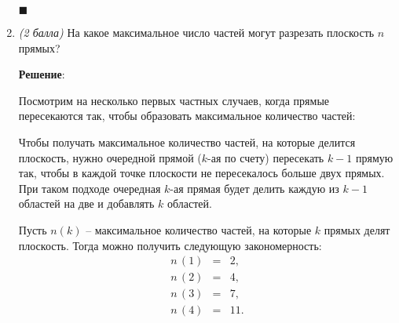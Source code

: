 \documentclass{article}
\begin{document}
\begin{enumerate}
        \begin{flushright}
            $\blacksquare$
        \end{flushright}

        \item \textit{(2 балла)} На какое максимальное число частей могут разрезать плоскость $n$ прямых?
        
        \textbf{Решение}:

        Посмотрим на несколько первых частных случаев, когда прямые пересекаются так, чтобы образовать максимальное количество частей:
        \begin{center}
        \end{center}

        Чтобы получать максимальное количество частей, на которые делится плоскость, нужно очередной прямой ($k$-ая по счету) пересекать $k-1$ прямую так, чтобы в каждой точке плоскости не пересекалось больше двух прямых. При таком подходе очередная $k$-ая прямая будет делить каждую из $k-1$ областей на две  и добавлять $k$ областей.

        Пусть $n(k)$ -- максимальное количество частей, на которые $k$ прямых делят плоскость. Тогда можно получить следующую закономерность:
        \begin{eqnarray}
            n\,(1) &=& 2, \\
            n\,(2) &=& 4, \\
            n\,(3) &=& 7, \\
            n\,(4) &=& 11.
        \end{eqnarray}


\end{enumerate}
\end{document}
